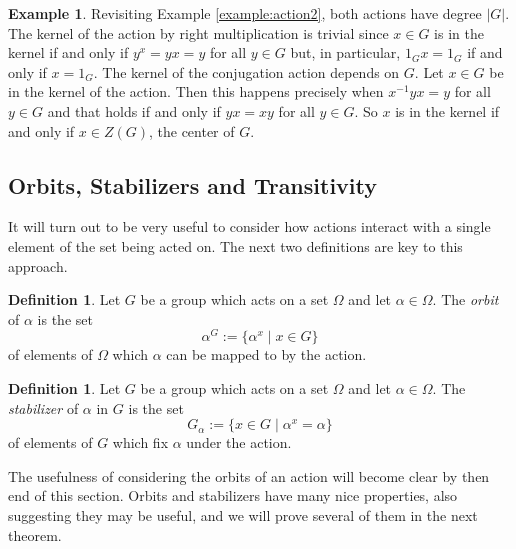 \documentclass[]{article}
\theoremstyle{definition}
\newtheorem{defn}[thm]{Definition}
\newtheorem{example}[thm]{Example}
\begin{document}
\begin{example} \label{example:action4}
	Revisiting Example \ref{example:action2}, both actions have degree $|G|$. The kernel of the action by right multiplication is trivial since $x \in G$ is in the kernel if and only if $y^x = yx = y$ for all $y \in G$ but, in particular, $1_G x = 1_G$ if and only if $x = 1_G$. The kernel of the conjugation action depends on $G$. Let $x \in G$ be in the kernel of the action. Then this happens precisely when $x^{-1}yx = y$ for all $y \in G$ and that holds if and only if $yx = xy$ for all $y \in G$. So $x$ is in the kernel if and only if $x \in Z(G)$, the center of $G$.
\end{example}

\subsection{Orbits, Stabilizers and Transitivity}

It will turn out to be very useful to consider how actions interact with a single element of the set being acted on. The next two definitions are key to this approach.

\begin{defn}
	Let $G$ be a group which acts on a set $\Omega$ and let $\alpha \in \Omega$. The \emph{orbit} of $\alpha$ is the set
	\begin{equation*}
		\alpha^G:=\{\alpha^x \; | \; x \in G \}
	\end{equation*}
	of elements of $\Omega$ which $\alpha$ can be mapped to by the action.
\end{defn}

\begin{defn}
	Let $G$ be a group which acts on a set $\Omega$ and let $\alpha \in \Omega$. The \emph{stabilizer} of $\alpha$ in $G$ is the set
	\begin{equation*}
		G_\alpha:=\{x \in G \; | \; \alpha^x = \alpha \}
	\end{equation*}
	of elements of $G$ which fix $\alpha$ under the action.
\end{defn}

The usefulness of considering the orbits of an action will become clear by then end of this section. Orbits and stabilizers have many nice properties, also suggesting they may be useful, and we will prove several of them in the next theorem.
\end{document}
